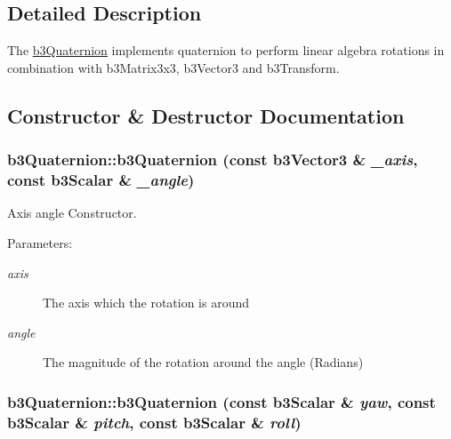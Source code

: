 \subsection{Detailed Description}
The \hyperlink{classb3_quaternion}{b3Quaternion} implements quaternion to perform linear algebra rotations in combination with b3Matrix3x3, b3Vector3 and b3Transform. 

\subsection{Constructor \& Destructor Documentation}
\hypertarget{classb3_quaternion_e9b2568fec426fbb4574bdcbd1bad418}{
\subsubsection[b3Quaternion]{\setlength{\rightskip}{0pt plus 5cm}b3Quaternion::b3Quaternion (const b3Vector3 \& {\em \_\-axis}, \/  const b3Scalar \& {\em \_\-angle})}}
\label{classb3_quaternion_e9b2568fec426fbb4574bdcbd1bad418}


Axis angle Constructor. 

\begin{Desc}
\item[Parameters:]
\begin{description}
\item[{\em axis}]The axis which the rotation is around \item[{\em angle}]The magnitude of the rotation around the angle (Radians) \end{description}
\end{Desc}
\hypertarget{classb3_quaternion_05b0b4abc7eaf5cb9ba00ea3b2353908}{
\subsubsection[b3Quaternion]{\setlength{\rightskip}{0pt plus 5cm}b3Quaternion::b3Quaternion (const b3Scalar \& {\em yaw}, \/  const b3Scalar \& {\em pitch}, \/  const b3Scalar \& {\em roll})}}
\label{classb3_quaternion_05b0b4abc7eaf5cb9ba00ea3b2353908}


